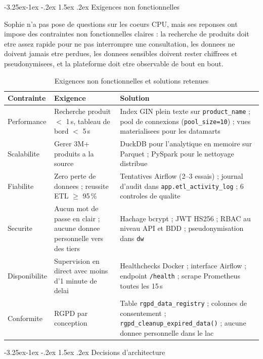 \documentclass[a4paper,11pt,oneside,openany]{report}
\makeatletter
\renewcommand\subsubsection{\@startsection{subsubsection}{3}{\z@}%
  {-3.25ex\@plus -1ex \@minus -.2ex}%
  {1.5ex \@plus .2ex}%
  {\normalfont\normalsize\bfseries\color{ntblue}}}
\newcommand{\rgpd}{RGPD}
\makeatother
\begin{document}
\subsubsection{Exigences non fonctionnelles}

Sophie n'a pas pose de questions sur les coeurs CPU, mais ses
reponses ont impose des contraintes non fonctionnelles claires : la
recherche de produits doit etre assez rapide pour ne pas interrompre
une consultation, les donnees ne doivent jamais etre perdues, les
donnees sensibles doivent rester chiffrees et pseudonymisees, et la
plateforme doit etre observable de bout en bout.

\begin{table}[H]
\centering
\caption{Exigences non fonctionnelles et solutions retenues}
\label{tab:nonfunc}
\begin{tabularx}{\textwidth}{L{2.5cm} L{4cm} L{6cm}}
\toprule
\textbf{Contrainte} & \textbf{Exigence} & \textbf{Solution} \\
\midrule
Performance & Recherche produit $<$ 1\,s, tableau de bord $<$ 5\,s & Index GIN plein texte sur \texttt{product\_name} ; pool de connexions (\texttt{pool\_size=10}) ; vues materialisees pour les datamarts \\
Scalabilite & Gerer 3M+ produits a la source & DuckDB pour l'analytique en memoire sur Parquet ; PySpark pour le nettoyage distribue \\
Fiabilite & Zero perte de donnees ; reussite ETL $\geq$ 95\,\% & Tentatives Airflow (2--3 essais) ; journal d'audit dans \texttt{app.etl\_activity\_log} ; 6 controles de qualite \\
Securite & Aucun mot de passe en clair ; aucune donnee personnelle vers des tiers & Hachage bcrypt ; JWT HS256 ; RBAC au niveau API et BDD ; pseudonymisation dans \texttt{dw} \\
Disponibilite & Supervision en direct avec moins d'1 minute de delai & Healthchecks Docker ; interface Airflow ; endpoint \texttt{/health} ; scrape Prometheus toutes les 15\,s \\
Conformite & \rgpd{} par conception & Table \texttt{rgpd\_data\_registry} ; colonnes de consentement ; \texttt{rgpd\_cleanup\_expired\_data()} ; aucune donnee personnelle dans le lac \\
\bottomrule
\end{tabularx}
\end{table}

\subsubsection{Decisions d'architecture}
\end{document}
